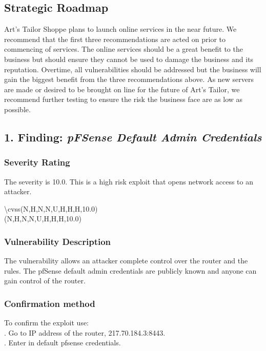 \documentclass[notitlepage]{article}
\begin{document}
	\subsection{Strategic Roadmap}
	\indent \indent Art's Tailor Shoppe plans to launch online services in the near future. We recommend that the first three recommendations are acted on prior to commencing of services. The online services should be a great benefit to the business but should ensure they cannot be used to damage the business and its reputation. Overtime, all vulnerabilities should be addressed but the business will gain the biggest benefit from the three recommendations above. As new servers are made or desired to be brought on line for the future of Art's Tailor, we recommend further testing to ensure the risk the business face are as low as possible. 
	
	
		
	\subsection{1. Finding: \emph{pFSense Default Admin Credentials}}
	
	\subsubsection{Severity Rating}
	\indent The severity is 10.0. This is a high risk exploit that opens network access to an attacker. 
	
	\textbackslash cvss(N,H,N,N,U,H,H,H,10.0)\\
	\cvss(N,H,N,N,U,H,H,H,10.0) \\
	
	\subsubsection{Vulnerability Description}
	\indent The vulnerability allows an attacker complete control over the router and the rules.  The pfSense default admin credentials are publicly known and anyone can gain control of the router.
	
	\subsubsection{Confirmation method}
	To confirm the exploit use: \\
	. Go to IP address of the router, 217.70.184.3:8443.\\
	. Enter in default pfsense credentials.\\
	
\end{document}
